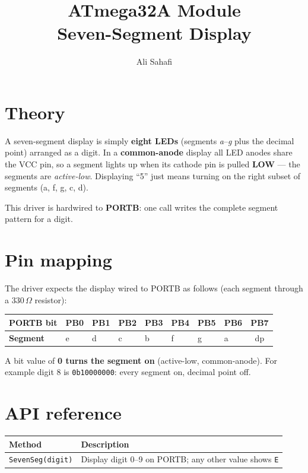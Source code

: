 \documentclass[11pt,a4paper]{article}
\title{ATmega32A Module \\ \Large Seven-Segment Display}
\author{Ali Sahafi}
\date{}
\begin{document}
\maketitle

\section{Theory}

A seven-segment display is simply \textbf{eight LEDs} (segments
\emph{a}--\emph{g} plus the decimal point) arranged as a digit. In a
\textbf{common-anode} display all LED anodes share the VCC pin, so a segment
lights up when its cathode pin is pulled \textbf{LOW} --- the segments are
\emph{active-low}. Displaying ``5'' just means turning on the right subset of
segments (a, f, g, c, d).

This driver is hardwired to \textbf{PORTB}: one call writes the complete
segment pattern for a digit.

\section{Pin mapping}

The driver expects the display wired to PORTB as follows (each segment
through a 330\,$\Omega$ resistor):

\begin{center}
\begin{tabular}{llllllllc}
\toprule
\textbf{PORTB bit} & PB0 & PB1 & PB2 & PB3 & PB4 & PB5 & PB6 & PB7 \\
\midrule
\textbf{Segment}   & e   & d   & c   & b   & f   & g   & a   & dp \\
\bottomrule
\end{tabular}
\end{center}

A bit value of \textbf{0 turns the segment on} (active-low, common-anode).
For example digit 8 is \texttt{0b10000000}: every segment on, decimal
point off.

\section{API reference}

\begin{center}
\begin{tabular}{ll}
\toprule
\textbf{Method} & \textbf{Description} \\
\midrule
\texttt{SevenSeg(digit)} & Display digit 0--9 on PORTB; any other value shows \texttt{E} \\
\bottomrule
\end{tabular}
\end{center}
\end{document}
